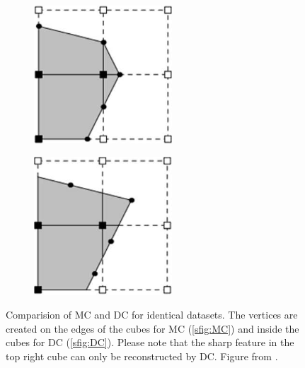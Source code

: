 \begin{figure}
\begin{center}
\begin{subfigure}{.45\textwidth}
\begin{center}
\includegraphics[width=.5\textwidth]{Pictures/SurfaceReconstruction/MC}
\label{sfig:MC}
\end{center}
\end{subfigure}
\begin{subfigure}{.45\textwidth}
\begin{center}
\includegraphics[width=.5\textwidth]{Pictures/SurfaceReconstruction/DC}
\label{sfig:DC}
\end{center}
\end{subfigure}
\caption{Comparision of \ac{MC} and \ac{DC} for identical datasets. The vertices are created on the edges of the cubes for \ac{MC} (\autoref{sfig:MC}) and inside the cubes for \ac{DC} (\autoref{sfig:DC}). Please note that the sharp feature in the top right cube can only be reconstructed by \ac{DC}. Figure from \cite{FromVoxelsToPolygons}.}
\label{fig:CompMCDC}
\end{center}
\end{figure}

